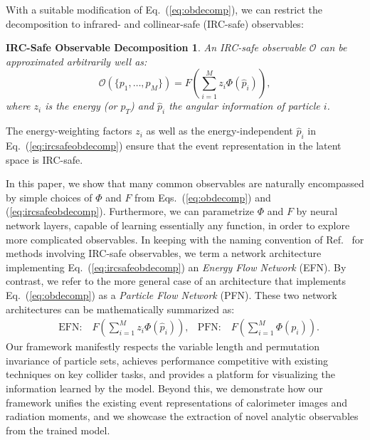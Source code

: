 \documentclass[letterpaper,11pt]{article}
\DeclareRobustCommand{\Eq}[1]{Eq.~(\ref{#1})}
\DeclareRobustCommand{\Eqs}[2]{Eqs.~(\ref{#1}) and (\ref{#2})}
\DeclareRobustCommand{\Ref}[1]{Ref.~\cite{#1}}
\newtheorem*{ircsafedecomp}{IRC-Safe Observable Decomposition}
\begin{document}
With a suitable modification of \Eq{eq:obdecomp}, we can restrict the decomposition to infrared- and collinear-safe (IRC-safe) observables:
\begin{ircsafedecomp}
An IRC-safe observable $\mathcal O$ can be approximated arbitrarily well as:
\begin{equation}
\label{eq:ircsafeobdecomp}
\mathcal O(\{p_1,\ldots,p_M\}) = F\left(\sum_{i=1}^M z_i\Phi (\hat p_i)\right),
\end{equation}
where $z_i$ is the energy (or $p_T$) and $\hat p_i$ the angular information of particle $i$.
\end{ircsafedecomp}
%
\noindent
The energy-weighting factors $z_i$ as well as the energy-independent $\hat p_i$ in \Eq{eq:ircsafeobdecomp} ensure that the event representation in the latent space is IRC-safe.


In this paper, we show that many common observables are naturally encompassed by simple choices of $\Phi$ and $F$ from \Eqs{eq:obdecomp}{eq:ircsafeobdecomp}.
%
Furthermore, we can parametrize $\Phi$ and $F$ by neural network layers, capable of learning essentially any function, in order to explore more complicated observables.
%
In keeping with the naming convention of \Ref{Komiske:2017aww} for methods involving IRC-safe observables, we term a network architecture implementing \Eq{eq:ircsafeobdecomp} an \emph{Energy Flow Network} (EFN).
%
By contrast, we refer to the more general case of an architecture that implements \Eq{eq:obdecomp} as a \emph{Particle Flow Network} (PFN).
%
These two network architectures can be mathematically summarized as:
\begin{align}
&\text{EFN:}\quad F\left(\sum_{i=1}^M z_i \Phi(\hat p_i)\right), &\text{PFN:}\quad F\left(\sum_{i=1}^M \Phi(p_i)\right).
\end{align}
%
Our framework manifestly respects the variable length and permutation invariance of particle sets, achieves performance competitive with existing techniques on key collider tasks, and provides a platform for visualizing the information learned by the model.
%
Beyond this, we demonstrate how our framework unifies the existing event representations of calorimeter images and radiation moments, and we showcase the extraction of novel analytic observables from the trained model.
\end{document}
